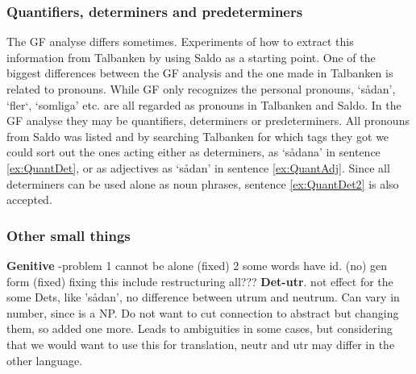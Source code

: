\documentclass{report}
\begin{document}

% 


\subsubsection{Quantifiers, determiners and predeterminers}
\label{sec:gf.quant}
The GF analyse differs sometimes. Experiments of how to extract
this information from Talbanken by using Saldo as a starting point.
One of the biggest differences between the GF analysis and the one made in Talbanken
is related to pronouns. While GF only recognizes the personal pronouns, 
`sådan', `fler`, `somliga' etc. are all regarded as pronouns in Talbanken and Saldo.
In the GF analyse they may be quantifiers, determiners or predeterminers. 
All pronouns from Saldo was listed and by searching Talbanken for which tags
they got we could sort out the ones acting either as
determiners, as `sådana' in sentence \ref{ex:QuantDet}, or as adjectives as
`sådan' in sentence \ref{ex:QuantAdj}. 
\label{ex:QuantDet}
\vspace{-3mm}
\label{ex:QuantAdj}
\vspace{-3mm}
\label{ex:QuantDet2}
Since all determiners can be used alone as noun phrases, sentence
\ref{ex:QuantDet2} is also accepted.

\subsubsection{Other small things}

\textbf{Genitive} -problem 1 cannot be alone (fixed) 2 some words have id. (no) gen form (fixed)
           fixing this include restructuring all???
\textbf{Det-utr}. not effect for the some Dets, like 'sådan', no difference between utrum and neutrum.
 Can vary in number, since is a NP. Do not want to cut connection to abstract but changing them,
 so added one more. Leads to ambiguities in some cases, but considering that we would want to use
 this for translation, neutr and utr may differ in the other language.
\end{document}

